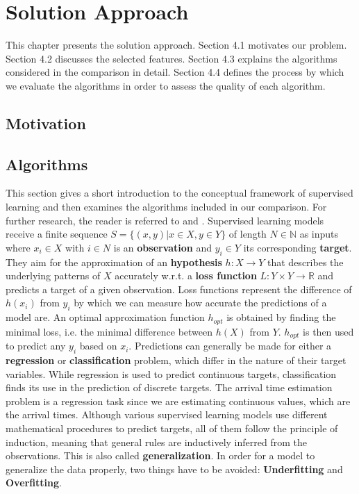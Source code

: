 

\chapter{Solution Approach}
This chapter presents the solution approach.
Section 4.1 motivates our problem. 
Section 4.2 discusses the selected features.
Section 4.3 explains the algorithms considered in the comparison in detail.
Section 4.4 defines the process by which we evaluate the algorithms in order to assess the quality of each algorithm.

\section{Motivation}



\section{Algorithms}
This section gives a short introduction to the conceptual framework of supervised learning and then examines the algorithms included in our comparison. For further research, the reader is referred to \cite{Bishop} and \cite{SLFoundations}.
\newline
\newline
Supervised learning models receive a finite sequence 
$S = \{(x, y) | x \in X, y \in Y\}$ of length $N \in \mathbb{N}$ as inputs where $x_i \in X$ with $i \in N$ is an \textbf{observation} and $y_i \in Y$ its corresponding \textbf{target}. They aim for the approximation of an \textbf{hypothesis} $h: X \to Y$ that describes the underlying patterns of $X$ accurately w.r.t. a \textbf{loss function} $L: Y \times Y \to \mathbb{R}$ and predicts a target of a given observation. Loss functions represent the difference of $h(x_i)$ from $y_i$ by which we can measure how accurate the predictions of a model are. An optimal approximation function $h_{opt}$ is obtained by finding the minimal loss, i.e. the minimal difference between $h(X)$ from $Y$. $h_{opt}$ is then used to predict any $y_i$ based on $x_i$.  
\newline
Predictions can generally be made for either a \textbf{regression} or \textbf{classification} problem, which differ in the nature of their target variables. While regression is used to predict continuous targets, classification finds its use in the prediction of discrete targets. The arrival time estimation problem is a regression task since we are estimating continuous values, which are the arrival times. 
Although various supervised learning models use different mathematical procedures to predict targets, all of them follow the principle of induction, meaning that general rules are inductively inferred from the  observations. This is also called \textbf{generalization}.  
In order for a model to generalize the data properly, two things have to be avoided: \textbf{Underfitting} and \textbf{Overfitting}. 



